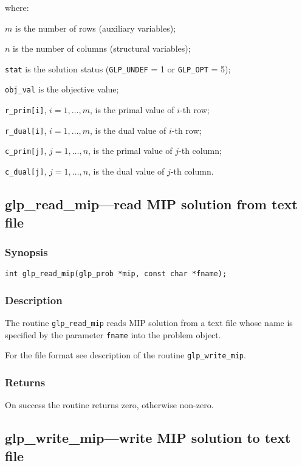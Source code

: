 \noindent
where:

\noindent
$m$ is the number of rows (auxiliary variables);

\noindent
$n$ is the number of columns (structural variables);

\noindent
\verb|stat| is the solution status (\verb|GLP_UNDEF| = 1 or
\verb|GLP_OPT| = 5);

\noindent
\verb|obj_val| is the objective value;

\noindent
\verb|r_prim[i]|, $i=1,\dots,m$, is the primal value of $i$-th row;

\noindent
\verb|r_dual[i]|, $i=1,\dots,m$, is the dual value of $i$-th row;

\noindent
\verb|c_prim[j]|, $j=1,\dots,n$, is the primal value of $j$-th column;

\noindent
\verb|c_dual[j]|, $j=1,\dots,n$, is the dual value of $j$-th column.

\subsection{glp\_read\_mip---read MIP solution from text file}

\subsubsection*{Synopsis}

\begin{verbatim}
int glp_read_mip(glp_prob *mip, const char *fname);
\end{verbatim}

\subsubsection*{Description}

The routine \verb|glp_read_mip| reads MIP solution from a text file
whose name is specified by the parameter \verb|fname| into the problem
object.

For the file format see description of the routine \verb|glp_write_mip|.

\subsubsection*{Returns}

On success the routine returns zero, otherwise non-zero.

\subsection{glp\_write\_mip---write MIP solution to text file}

